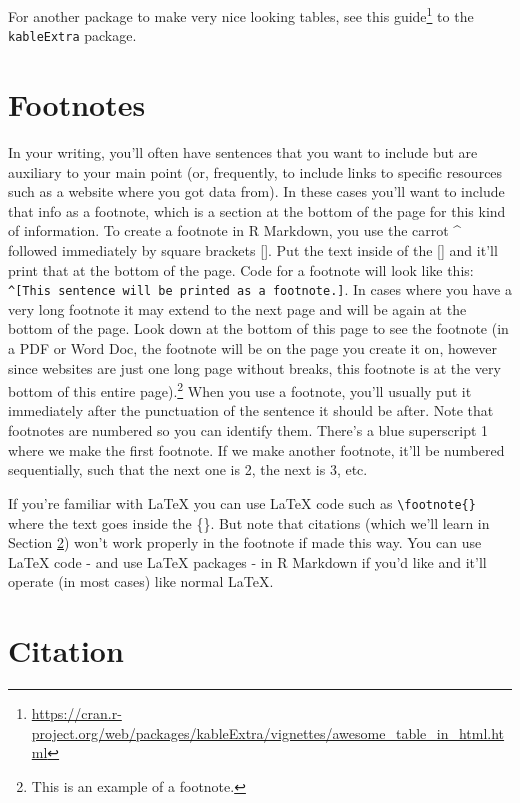\documentclass[
]{krantz}
\renewcommand{\href}[2]{#2\footnote{\url{#1}}}
\begin{document}
For another package to make very nice looking tables, see
\href{https://cran.r-project.org/web/packages/kableExtra/vignettes/awesome_table_in_html.html}{this
guide} to the \texttt{kableExtra} package.

\hypertarget{footnotes}{%
\section{Footnotes}\label{footnotes}}

In your writing, you'll often have sentences that you want
to include but are auxiliary to your main point (or,
frequently, to include links to specific resources such as a
website where you got data from). In these cases you'll want
to include that info as a footnote, which is a section at
the bottom of the page for this kind of information. To
create a footnote in R Markdown, you use the carrot \^{}
followed immediately by square brackets {[}{]}. Put the text
inside of the {[}{]} and it'll print that at the bottom of
the page. Code for a footnote will look like this:
\texttt{\^{}{[}This\ sentence\ will\ be\ printed\ as\ a\ footnote.{]}}.
In cases where you have a very long footnote it may extend
to the next page and will be again at the bottom of the
page. Look down at the bottom of this page to see the
footnote (in a PDF or Word Doc, the footnote will be on the
page you create it on, however since websites are just one
long page without breaks, this footnote is at the very
bottom of this entire page).\footnote{This is an example of
  a footnote.} When you use a footnote, you'll usually put
it immediately after the punctuation of the sentence it
should be after. Note that footnotes are numbered so you can
identify them. There's a blue superscript 1 where we make
the first footnote. If we make another footnote, it'll be
numbered sequentially, such that the next one is 2, the next
is 3, etc.

If you're familiar with LaTeX you can use LaTeX code such as
\texttt{\textbackslash{}footnote\{\}} where the text goes
inside the \{\}. But note that citations (which we'll learn
in Section \ref{citation}) won't work properly in the
footnote if made this way. You can use LaTeX code - and use
LaTeX packages - in R Markdown if you'd like and it'll
operate (in most cases) like normal LaTeX.

\hypertarget{citation}{%
\section{Citation}\label{citation}}
\end{document}
